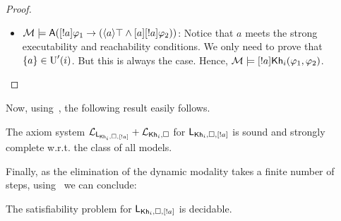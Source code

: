 \begin{proof}
\begin{itemize}
    \item $\mathcal{M} \models {\sf A}([!a] \varphi_1 \rightarrow (\langle a \rangle\top \wedge [a] [!a]\varphi_2))$: Notice that $a$ meets the strong executability and reachability conditions.
    We only need to prove that $\{ a \} \in \operatorname{U}'(i)$. But this is always the case. Hence,  $\mathcal{M} \models [!a]{\sf Kh}_i(\varphi_1,\varphi_2)$.
\end{itemize}
\end{proof}

Now, using~, the following result easily follows.

\medskip 

\begin{theorem}\label{th:sscomplete}
The axiom system $\mathcal{L}_{\mathsf{L}_{{\sf Kh}_i,\square,[!a]}}+\mathcal{L}_{{\sf Kh}_i,\square}$ for $\mathsf{L}_{{\sf Kh}_i,\square,[!a]}$ is sound and strongly complete w.r.t. the class of all models.
\end{theorem}

\medskip 

Finally, as the elimination of the dynamic modality takes a finite number of steps, using~ we can conclude:

\medskip 

\begin{corollary}
The satisfiability problem for $\mathsf{L}_{{\sf Kh}_i,\square,[!a]}$ is decidable.
\end{corollary} 
